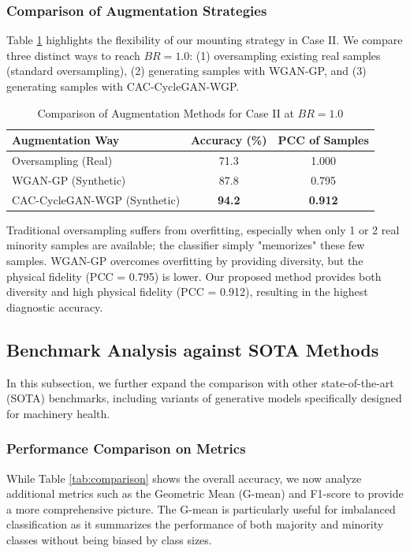 \subsubsection{Comparison of Augmentation Strategies}
Table \ref{tab:aug_comparison_case2} highlights the flexibility of our mounting strategy in Case II. We compare three distinct ways to reach $BR=1.0$: (1) oversampling existing real samples (standard oversampling), (2) generating samples with WGAN-GP, and (3) generating samples with CAC-CycleGAN-WGP.

\begin{table}[htbp]
\centering
\caption{Comparison of Augmentation Methods for Case II at $BR=1.0$}
\label{tab:aug_comparison_case2}
\begin{tabular}{lcc}
\hline
\textbf{Augmentation Way} & \textbf{Accuracy (\%)} & \textbf{PCC of Samples} \\ \hline
Oversampling (Real) & 71.3 & 1.000 \\
WGAN-GP (Synthetic) & 87.8 & 0.795 \\
CAC-CycleGAN-WGP (Synthetic) & \textbf{94.2} & \textbf{0.912} \\
\hline
\end{tabular}
\end{table}

Traditional oversampling suffers from overfitting, especially when only 1 or 2 real minority samples are available; the classifier simply "memorizes" these few samples. WGAN-GP overcomes overfitting by providing diversity, but the physical fidelity (PCC = 0.795) is lower. Our proposed method provides both diversity and high physical fidelity (PCC = 0.912), resulting in the highest diagnostic accuracy.

\subsection{Benchmark Analysis against SOTA Methods}
In this subsection, we further expand the comparison with other state-of-the-art (SOTA) benchmarks, including variants of generative models specifically designed for machinery health.

\subsubsection{Performance Comparison on Metrics}
While Table \ref{tab:comparison} shows the overall accuracy, we now analyze additional metrics such as the Geometric Mean (G-mean) and F1-score to provide a more comprehensive picture. The G-mean is particularly useful for imbalanced classification as it summarizes the performance of both majority and minority classes without being biased by class sizes.

